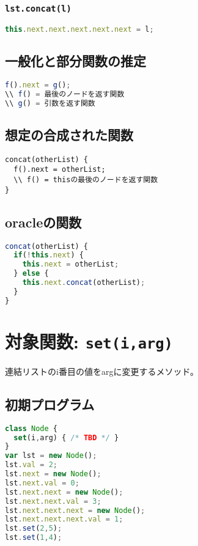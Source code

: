 \documentclass{article}
\begin{document}
\subsubsection{\texttt{lst.concat(l)}}
\begin{lstlisting}[language=JavaScript]
this.next.next.next.next.next = l;
\end{lstlisting}

\subsection{一般化と部分関数の推定}

\begin{lstlisting}[language=JavaScript]
f().next = g();
\\ f() = 最後のノードを返す関数
\\ g() = 引数を返す関数
\end{lstlisting}

\subsection{想定の合成された関数}
\begin{lstlisting}
concat(otherList) {
  f().next = otherList;
  \\ f() = thisの最後のノードを返す関数
}
\end{lstlisting}

\subsection{oracleの関数}
\begin{lstlisting}[language=JavaScript]
concat(otherList) {
  if(!this.next) {
    this.next = otherList;
  } else {
    this.next.concat(otherList);
  }
}
\end{lstlisting}






\section{対象関数: \texttt{set(i,arg)}}
連結リストのi番目の値をargに変更するメソッド。

\subsection{初期プログラム}

\begin{lstlisting}[language=JavaScript]
class Node {
  set(i,arg) { /* TBD */ }
}
var lst = new Node(); 
lst.val = 2;
lst.next = new Node();
lst.next.val = 0;
lst.next.next = new Node(); 
lst.next.next.val = 3;
lst.next.next.next = new Node(); 
lst.next.next.next.val = 1;
lst.set(2,5);
lst.set(1,4);
\end{lstlisting}
\end{document}
